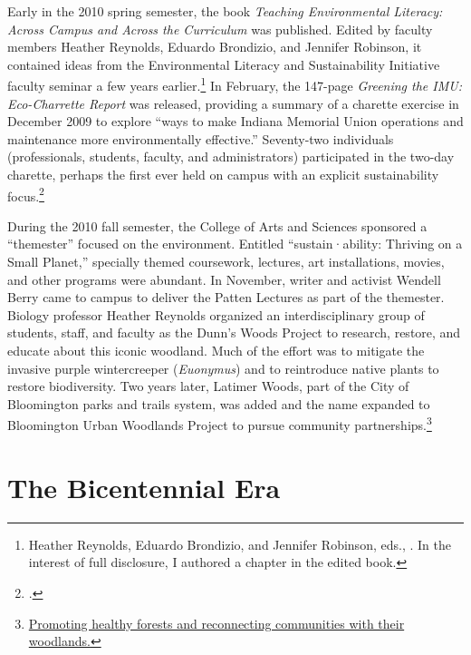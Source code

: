 \documentclass[
  american,
  letterpaper,
]{scrreprt}
\begin{document}
Early in the 2010 spring semester, the book \emph{Teaching Environmental
Literacy: Across Campus and Across the Curriculum} was published. Edited
by faculty members Heather Reynolds, Eduardo Brondizio, and Jennifer
Robinson, it contained ideas from the Environmental Literacy and
Sustainability Initiative faculty seminar a few years
earlier.\footnote{Heather Reynolds, Eduardo Brondizio, and Jennifer
  Robinson, eds., . In the interest of
  full disclosure, I authored a chapter in the edited book.} In
February, the 147-page \emph{Greening the IMU: Eco-Charrette Report} was
released, providing a summary of a charette exercise in December 2009 to
explore ``ways to make Indiana Memorial Union operations and maintenance
more environmentally effective.'' Seventy-two individuals
(professionals, students, faculty, and administrators) participated in
the two-day charette, perhaps the first ever held on campus with an
explicit sustainability focus.\footnote{.}

During the 2010 fall semester, the College of Arts and Sciences
sponsored a ``themester'' focused on the environment. Entitled
``sustain·ability: Thriving on a Small Planet,'' specially themed
coursework, lectures, art installations, movies, and other programs were
abundant. In November, writer and activist Wendell Berry came to campus
to deliver the Patten Lectures as part of the themester. Biology
professor Heather Reynolds organized an interdisciplinary group of
students, staff, and faculty as the Dunn's Woods Project to research,
restore, and educate about this iconic woodland. Much of the effort was
to mitigate the invasive purple wintercreeper (\emph{Euonymus}) and to
reintroduce native plants to restore biodiversity. Two years later,
Latimer Woods, part of the City of Bloomington parks and trails system,
was added and the name expanded to Bloomington Urban Woodlands Project
to pursue community partnerships.\footnote{\href{https://sustain.iu.edu/buwp.html}{Promoting
  healthy forests and reconnecting communities with their woodlands.}}

\section{The Bicentennial Era}\label{the-bicentennial-era}
\end{document}
